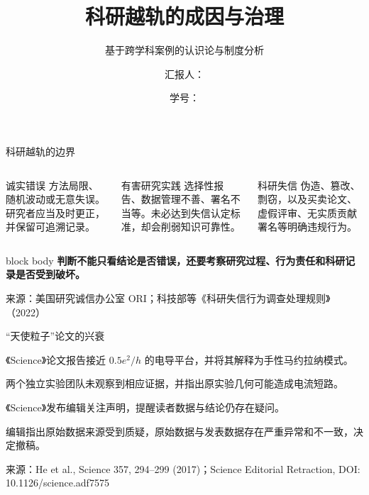 \documentclass[aspectratio=169,10pt]{ctexbeamer}
\title{科研越轨的成因与治理}
\subtitle{基于跨学科案例的认识论与制度分析}
\author{汇报人：\underline{\hspace{3.2cm}}}
\institute{自然辩证法课程汇报}
\date{学号：\underline{\hspace{3.2cm}}}
\newcommand{\source}[1]{%
  \par\vfill\begingroup\color{Muted}\fontsize{5.8}{7}\selectfont 来源：#1\endgroup
}
\newcommand{\takeaway}[1]{%
  \begin{beamercolorbox}[rounded=true,sep=0.65em,wd=\linewidth]{block body}
    \centering\color{MutedBlue}\textbf{#1}
  \end{beamercolorbox}
}
\begin{document}
\begin{frame}[plain]
  \titlepage
\end{frame}

\begin{frame}{科研越轨的边界}
  \begin{columns}[T,onlytextwidth]
      \begin{block}{诚实错误}
        方法局限、随机波动或无意失误。研究者应当及时更正，并保留可追溯记录。
      \end{block}
      \begin{block}{有害研究实践}
        选择性报告、数据管理不善、署名不当等。未必达到失信认定标准，却会削弱知识可靠性。
      \end{block}
      \begin{block}{科研失信}
        伪造、篡改、剽窃，以及买卖论文、虚假评审、无实质贡献署名等明确违规行为。
      \end{block}
  \end{columns}

  \vspace{0.45cm}
  \takeaway{判断不能只看结论是否错误，还要考察研究过程、行为责任和科研记录是否受到破坏。}
  \source{美国研究诚信办公室 ORI；科技部等《科研失信行为调查处理规则》（2022）}
\end{frame}

\begin{frame}{“天使粒子”论文的兴衰}

  \begin{description}[2022.11]
    \item[2017.07] 《Science》论文报告接近 $0.5e^2/h$ 的电导平台，并将其解释为手性马约拉纳模式。
    \vspace{0.24cm}
    \item[2020.01] 两个独立实验团队未观察到相应证据，并指出原实验几何可能造成电流短路。
    \vspace{0.24cm}
    \item[2021.12] 《Science》发布编辑关注声明，提醒读者数据与结论仍存在疑问。
    \vspace{0.24cm}
    \item[2022.11] 编辑指出原始数据来源受到质疑，原始数据与发表数据存在严重异常和不一致，决定撤稿。
  \end{description}

  \source{He et al., Science 357, 294--299 (2017)；Science Editorial Retraction, DOI: 10.1126/science.adf7575}
\end{frame}
\end{document}
